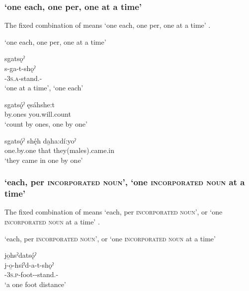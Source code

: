 \subsubsection*{ ‘one each, one per, one at a time’} \label{[s/j/ji-pronominal prefix-t-sǫˀ]}
The fixed combination of  means ‘one each, one per, one at a time’ .


\ea\label{ex:eachperex5}  ‘one each, one per, one at a time’

\ea sgatsǫˀ \\
\gll s-ga-t-shǫˀ\\
{\repetitive}-\textsc{3s.a}-stand.{\stat}-{\pluralizer}\\
\glt ‘one at a time’, `one each'
   
    
    \ex 
    \gll sgatsǫ́ˀ ęsáhshe:t \\
    by.ones you.will.count\\
    \glt ‘count by ones, one by one’ 
    
    \ex 
    \gll sgatsǫ́ˀ shę́h da̱ha:dí:yoˀ \\
    one.by.one that they(males).came.in\\
    \glt ‘they came in one by one’ 
    \z
    \z


\subsubsection*{ ‘each, per \textsc{incorporated noun}’, ‘one \textsc{incorporated noun} at a time’} \label{[s/j/ji-pronominal prefix-incorporated noun-t-sǫˀ]}
The fixed combination of  means ‘each, per \textsc{incorporated noun}’, or ‘one \textsc{incorporated noun} at a time’ .

\ea\label{ex:eachperex1}  ‘each, per \textsc{incorporated noun}’, or ‘one \textsc{incorporated noun} at a time’

\ea jo̱hsˀdatsǫ́ˀ\\
\gll j-o̱-hsíˀd-a-t-shǫˀ\\
{\repetitive}-\textsc{3s.p}-foot-{\joinerA}-stand.{\stat}-{\pluralizer}\\
\glt `a one foot distance'

